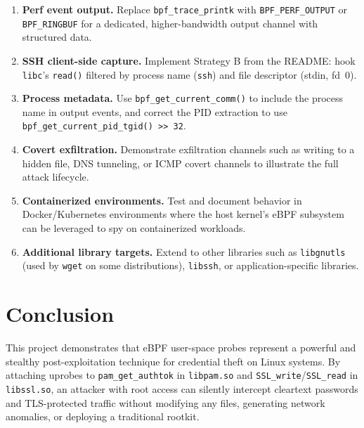 \documentclass[11pt,a4paper]{article}
\begin{document}
\begin{enumerate}
    \item \textbf{Perf event output.} Replace \texttt{bpf\_trace\_printk} with
          \texttt{BPF\_PERF\_OUTPUT} or \texttt{BPF\_RINGBUF} for a dedicated,
          higher-bandwidth output channel with structured data.

    \item \textbf{SSH client-side capture.} Implement Strategy B from the
          README: hook \texttt{libc}'s \texttt{read()} filtered by process
          name (\texttt{ssh}) and file descriptor (stdin, fd~0).

    \item \textbf{Process metadata.} Use \texttt{bpf\_get\_current\_comm()} to
          include the process name in output events, and correct the PID
          extraction to use \texttt{bpf\_get\_current\_pid\_tgid() >> 32}.

    \item \textbf{Covert exfiltration.} Demonstrate exfiltration channels such
          as writing to a hidden file, DNS tunneling, or ICMP covert channels
          to illustrate the full attack lifecycle.

    \item \textbf{Containerized environments.} Test and document behavior in
          Docker/Kubernetes environments where the host kernel's eBPF subsystem
          can be leveraged to spy on containerized workloads.

    \item \textbf{Additional library targets.} Extend to other libraries such
          as \texttt{libgnutls} (used by \texttt{wget} on some distributions),
          \texttt{libssh}, or application-specific libraries.
\end{enumerate}


\section{Conclusion}
\label{sec:conclusion}

This project demonstrates that eBPF user-space probes represent a powerful and
stealthy post-exploitation technique for credential theft on Linux systems. By
attaching uprobes to \texttt{pam\_get\_authtok} in \texttt{libpam.so} and
\texttt{SSL\_write}/\texttt{SSL\_read} in \texttt{libssl.so}, an attacker with
root access can silently intercept cleartext passwords and TLS-protected
traffic without modifying any files, generating network anomalies, or deploying
a traditional rootkit.
\end{document}

